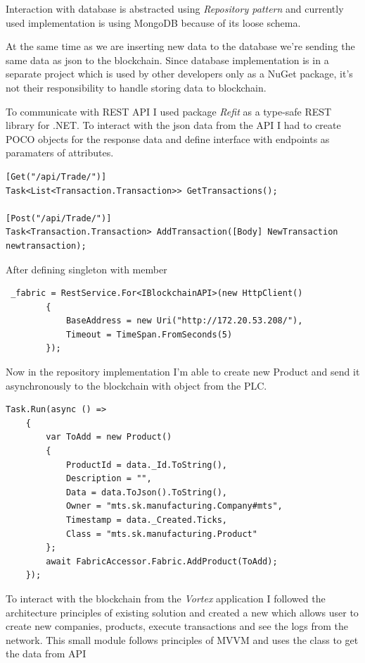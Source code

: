 Interaction with database is abstracted using \emph{Repository pattern} and currently used implementation is using MongoDB because of its loose schema. 

At the same time as we are inserting new data to the database we're sending the same data as json to the blockchain. Since database implementation is in a separate project which is used by other developers only as a NuGet package, it's not their responsibility to handle storing data to blockchain. 

To communicate with REST API I used package \emph{Refit} as a type-safe REST library for .NET. To interact with the json data from the API I had to create POCO objects for the response data and define interface with endpoints as paramaters of attributes.

\begin{lstlisting}
[Get("/api/Trade/")]
Task<List<Transaction.Transaction>> GetTransactions();

[Post("/api/Trade/")]
Task<Transaction.Transaction> AddTransaction([Body] NewTransaction newtransaction);
\end{lstlisting}
\newpage

After defining singleton  with member

\begin{lstlisting}
 _fabric = RestService.For<IBlockchainAPI>(new HttpClient()
        {
            BaseAddress = new Uri("http://172.20.53.208/"),
            Timeout = TimeSpan.FromSeconds(5)
        });
\end{lstlisting}

Now in the repository implementation I'm able to create new Product and send it asynchronously to the blockchain with  object from the PLC.

\begin{lstlisting}
Task.Run(async () =>
    {
        var ToAdd = new Product()
        {
            ProductId = data._Id.ToString(),
            Description = "",
            Data = data.ToJson().ToString(),
            Owner = "mts.sk.manufacturing.Company#mts",
            Timestamp = data._Created.Ticks,
            Class = "mts.sk.manufacturing.Product"
        };
        await FabricAccessor.Fabric.AddProduct(ToAdd);                  
    });
\end{lstlisting}

To interact with the blockchain from the \emph{Vortex} application I followed the architecture principles of existing solution and created a new which allows user to create new companies, products, execute transactions and see the logs from the network. This small module follows principles of MVVM and uses the  class to get the data from API

